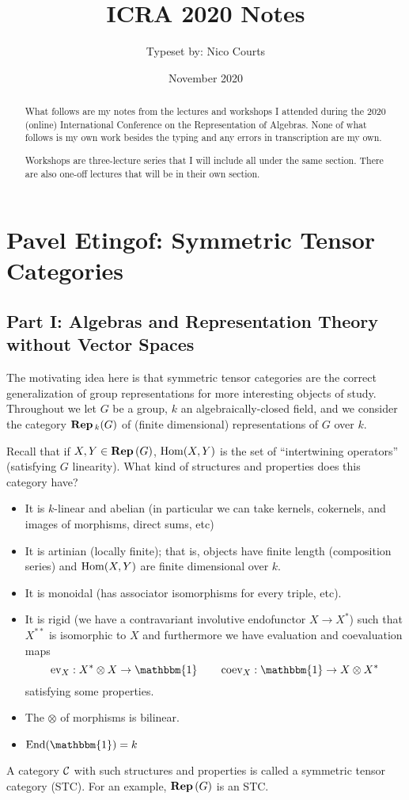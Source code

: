 \documentclass[12pt]{article}
\title{ICRA 2020 Notes}
\author{Typeset by: Nico Courts}
\date{November 2020}
\begin{document}
\maketitle
\begin{abstract}
    What follows are my notes from the lectures and workshops I attended during the 2020 (online) International Conference on the Representation of Algebras. None of what follows is my own work besides the typing and any errors in transcription are my own.
    
    Workshops are three-lecture series that I will include all under the same section. There are also one-off lectures that will be in their own section.
\end{abstract}
\section{Pavel Etingof: Symmetric Tensor Categories}
\subsection{Part I: Algebras and Representation Theory without Vector Spaces}
The motivating idea here is that symmetric tensor categories are the correct generalization of group representations for more interesting objects of study. Throughout we let $G$ be a group, $k$ an algebraically-closed field, and we consider the category $\mathbf{Rep}\,_k(G)$ of (finite dimensional) representations of $G$ over $k$.

Recall that if $X,Y\in\mathbf{Rep}\,(G)$, $\operatorname{Hom}(X,Y)$ is the set of ``intertwining operators'' (satisfying $G$ linearity). What kind of structures and properties does this category have?
\begin{itemize}
    \item It is $k$-linear and abelian (in particular we can take kernels, cokernels, and images of morphisms, direct sums, etc)
    \item It is artinian (locally finite); that is, objects have finite length (composition series) and $\operatorname{Hom}(X,Y)$ are finite dimensional over $k$.
    \item It is monoidal (has associator isomorphisms for every triple, etc).
    \item It is rigid (we have a contravariant involutive endofunctor $X\to X^\ast$) such that $X^{\ast\ast}$ is isomorphic to $X$ and furthermore we have evaluation and coevaluation maps
    \[\operatorname{ev}_X:X^\ast\otimes X\to\mathbbm{1}\qquad \operatorname{coev}_X:\mathbbm{1}\to X\otimes X^\ast\]
    satisfying some properties.
    \item The $\otimes$ of morphisms is bilinear.
    \item $\End(\mathbbm{1})=k$
\end{itemize}
\begin{defn}
A category $\mathcal{C}$ with such structures and properties is called a symmetric tensor category (STC). For an example, $\mathbf{Rep}\,(G)$ is an STC.
\end{defn}
\end{document}
